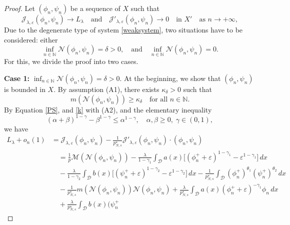 \documentclass[reqno]{amsart}
\begin{document}
\begin{proof}
Let $(\phi_n,\psi_n)$ be a sequence of $X$ such that
\begin{equation}\label{PS}
\mathcal{J}_{\lambda,\varepsilon}(\phi_n,\psi_n)\to L_\lambda\quad\text{and}\quad
\mathcal{J}'_{\lambda,\varepsilon}(\phi_n,\psi_n)\to 0\quad\text{in } X'\quad\text{as } 
n\to +\infty,
\end{equation}
Due to the degenerate type of system \eqref{weaksystem}, two situations have to be 
considered: either
$$
\inf_{n\in \mathbb{N}} \mathcal{N}(\phi_n,\psi_n)=\delta>0,\quad
 \text{and}\quad
 \inf_{n\in \mathbb{N}} \mathcal{N}(\phi_n,\psi_n)=0.
$$
For this, we divide the proof into two cases.
\smallskip

\noindent\textbf{Case 1:} $\inf_{n\in \mathbb{N}} \mathcal{N}(\phi_n,\psi_n)=\delta>0$. 
At the beginning, we show that $(\phi_n,\psi_n)$ is bounded in $X$. By assumption 
(A1), there exists $\kappa_\delta>0$ such that
\begin{equation}\label{k}
m(\mathcal{N}(\phi_n,\psi_n))\geq \kappa_\delta\quad \text{for all } n\in\mathbb{N}.
\end{equation}
By Equation \eqref{PS}, and \eqref{k} with (A2), and the elementary inequality
\begin{equation}\label{elementary}
(\alpha+\beta)^{1-\gamma}-\beta^{1-\gamma}\leq \alpha^{1-\gamma},\quad
 \alpha,\beta\geq 0,\; \gamma\in (0,1),
\end{equation}
we have
\begin{equation} \label{K000}
\begin{aligned}
L_\lambda+o_n(1)
&=\mathcal{J}_{\lambda,\varepsilon}(\phi_n,\psi_n)-\frac{1}{p^\star_{N,s}}
 \mathcal{J}'_{\lambda,\varepsilon}(\phi_n,\psi_n)\cdot (\phi_n,\psi_n) \\
&\quad =\frac{1}{p}\mathscr{M}(\mathcal{N}(\phi_n,\psi_n))-\frac{\lambda}{1-\gamma_1}
 \int_\mathcal{D} a(x)\Big[(\phi_n^++\varepsilon)^{1-\gamma_1}
 -\varepsilon^{1-\gamma_1}\Big]\,dx \\
&\quad -\frac{\lambda}{1-\gamma_2}\int_\mathcal{D} b(x)\Big[(\psi_n^+
 +\varepsilon)^{1-\gamma_2}-\varepsilon^{1-\gamma_2}\Big]\,dx
 -\frac{1}{p^\star_{N,s}}\int_\mathcal{D}  (\phi_n^+)^{\theta_1}(\psi_n^+)^{\theta_2}\,dx
 \\
&\quad -\frac{1}{p^\star_{N,s}}m(\mathcal{N}(\phi_n,\psi_n))\mathcal{N}(\phi_n,\psi_n)
 +\frac{\lambda}{p^\star_{N,s}}\int_\mathcal{D} a(x)(\phi_n^++\varepsilon)^{-\gamma_1}
 \phi_n\,dx  \\
&\quad +\frac{\lambda}{p^\star_{N,s}}\int_\mathcal{D}b(x)(\psi_n^+

\end{aligned}
\end{equation}
\end{proof}
\end{document}
